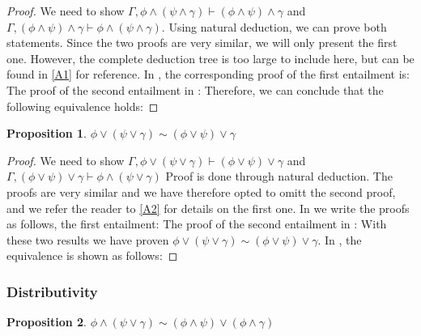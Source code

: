 \documentclass[titlepage]{article}
\newtheorem{proposition}{Proposition}
\begin{document}
\begin{proof}
    We need to show $\Gamma, \phi \wedge (\psi \wedge \gamma) \vdash (\phi \wedge \psi) \wedge \gamma$ and $\Gamma, (\phi \wedge \psi) \wedge \gamma \vdash \phi \wedge (\psi \wedge \gamma)$. Using natural deduction, we can prove both statements. Since the two proofs are very similar, we will only present the first one. However, the complete deduction tree is too large to include here, but can be found in \ref{A1} for reference. In \Agda, the corresponding proof of the first entailment is:
    The proof of the second entailment in \Agda:
    Therefore, we can conclude that the following equivalence holds:
\end{proof}

\begin{proposition}
    $\phi \vee (\psi \vee \gamma) \sim (\phi \vee \psi) \vee \gamma$
\end{proposition}

\begin{proof}
    We need to show $\Gamma, \phi \vee (\psi \vee \gamma) \vdash (\phi \vee \psi) \vee \gamma$ and $\Gamma, (\phi \vee \psi) \vee \gamma \vdash \phi \wedge (\psi \vee \gamma)$ Proof is done through natural deduction. The proofs are very similar and we have therefore opted to omitt the second proof, and we refer the reader to \ref{A2} for details on the first one. In \Agda we write the proofs as follows, the first entailment:
    The proof of the second entailment in \Agda:
    With these two results we have proven $\phi \vee (\psi \vee \gamma) \sim (\phi \vee \psi) \vee \gamma$. In \Agda, the equivalence is shown as follows:
\end{proof}




\subsubsection{Distributivity}

\begin{proposition}
    $\phi \wedge (\psi \vee \gamma) \sim (\phi \wedge \psi) \vee (\phi \wedge \gamma)$
\end{proposition}
\end{document}
